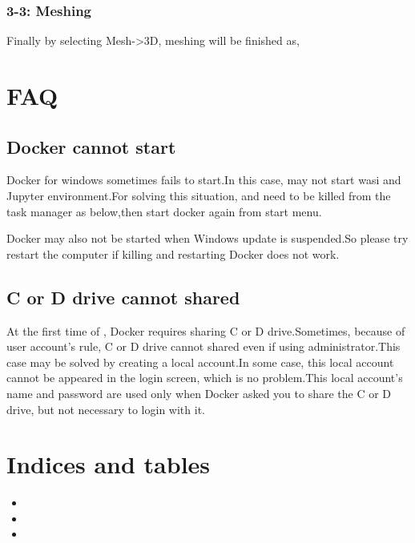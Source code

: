 \documentclass[letterpaper,10pt,english]{sphinxmanual}
\begin{document}
\subsection{3-3: Meshing}
\label{\detokenize{meshing:id4}}
Finally by selecting Mesh-\textgreater{}3D, meshing will be finished as,




\chapter{FAQ}
\label{\detokenize{faq:faq}}\label{\detokenize{faq::doc}}

\section{Docker cannot start}
\label{\detokenize{faq:docker-cannot-start}}
Docker for windows sometimes fails to start.In this case,  may not start wasi and Jupyter environment.For solving this situation,  and  need to be killed from the task manager as below,then start docker again from start menu.

Docker may also not be started when Windows update is suspended.So please try restart the computer if killing and restarting Docker does not work.


\section{C or D drive cannot shared}
\label{\detokenize{faq:c-or-d-drive-cannot-shared}}
At the first time of , Docker requires sharing C or D drive.Sometimes, because of user account’s rule, C or D drive cannot shared even if using administrator.This case may be solved by creating a local account.In some case, this local account cannot be appeared in the login screen, which is no problem.This local account’s name and password are used only when Docker asked you to share the C or D drive, but not necessary to login with it.


\chapter{Indices and tables}
\label{\detokenize{index:indices-and-tables}}\begin{itemize}
\item {} 

\item {} 

\item {} 

\end{itemize}



\renewcommand{\indexname}{Index}
\printindex
\end{document}
